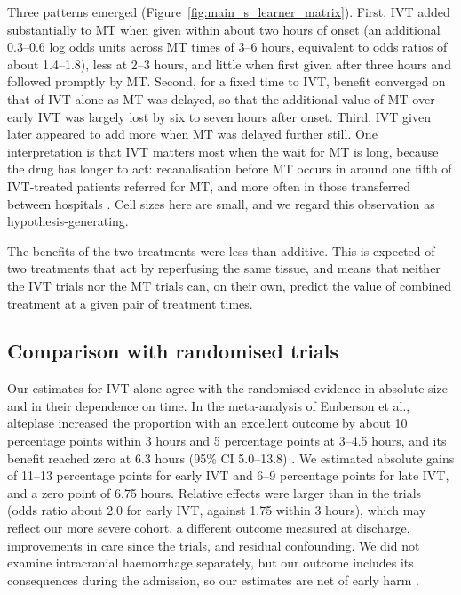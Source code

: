 Three patterns emerged (Figure~\ref{fig:main_s_learner_matrix}). First, IVT added substantially to MT when given within about two hours of onset (an additional 0.3--0.6 log odds units across MT times of 3--6 hours, equivalent to odds ratios of about 1.4--1.8), less at 2--3 hours, and little when first given after three hours and followed promptly by MT. Second, for a fixed time to IVT, benefit converged on that of IVT alone as MT was delayed, so that the additional value of MT over early IVT was largely lost by six to seven hours after onset. Third, IVT given later appeared to add more when MT was delayed further still. One interpretation is that IVT matters most when the wait for MT is long, because the drug has longer to act: recanalisation before MT occurs in around one fifth of IVT-treated patients referred for MT, and more often in those transferred between hospitals \cite{seners2016,seners2018}. Cell sizes here are small, and we regard this observation as hypothesis-generating.

The benefits of the two treatments were less than additive. This is expected of two treatments that act by reperfusing the same tissue, and means that neither the IVT trials nor the MT trials can, on their own, predict the value of combined treatment at a given pair of treatment times.

\subsection{Comparison with randomised trials}

Our estimates for IVT alone agree with the randomised evidence in absolute size and in their dependence on time. In the meta-analysis of Emberson et al., alteplase increased the proportion with an excellent outcome by about 10 percentage points within 3 hours and 5 percentage points at 3--4.5 hours, and its benefit reached zero at 6.3 hours (95\% CI 5.0--13.8) \cite{emberson_effect_2014}. We estimated absolute gains of 11--13 percentage points for early IVT and 6--9 percentage points for late IVT, and a zero point of 6.75 hours. Relative effects were larger than in the trials (odds ratio about 2.0 for early IVT, against 1.75 within 3 hours), which may reflect our more severe cohort, a different outcome measured at discharge, improvements in care since the trials, and residual confounding. We did not examine intracranial haemorrhage separately, but our outcome includes its consequences during the admission, so our estimates are net of early harm \cite{whiteley2016}.

